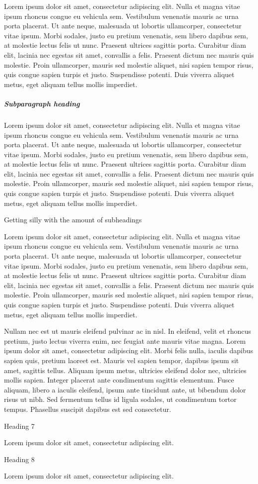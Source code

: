 \documentclass[doc,longtable]{apa6}
\begin{document}
Lorem ipsum dolor sit amet, consectetur adipiscing elit. Nulla et magna
vitae ipsum rhoncus congue eu vehicula sem. Vestibulum venenatis mauris
ac urna porta placerat. Ut ante neque, malesuada ut lobortis
ullamcorper, consectetur vitae ipsum. Morbi sodales, justo eu pretium
venenatis, sem libero dapibus sem, at molestie lectus felis ut nunc.
Praesent ultrices sagittis porta. Curabitur diam elit, lacinia nec
egestas sit amet, convallis a felis. Praesent dictum nec mauris quis
molestie. Proin ullamcorper, mauris sed molestie aliquet, nisi sapien
tempor risus, quis congue sapien turpis et justo. Suspendisse potenti.
Duis viverra aliquet metus, eget aliquam tellus mollis imperdiet.

\hypertarget{subparagraph-heading}{%
\subparagraph{Subparagraph heading}\label{subparagraph-heading}}

Lorem ipsum dolor sit amet, consectetur adipiscing elit. Nulla et magna
vitae ipsum rhoncus congue eu vehicula sem. Vestibulum venenatis mauris
ac urna porta placerat. Ut ante neque, malesuada ut lobortis
ullamcorper, consectetur vitae ipsum. Morbi sodales, justo eu pretium
venenatis, sem libero dapibus sem, at molestie lectus felis ut nunc.
Praesent ultrices sagittis porta. Curabitur diam elit, lacinia nec
egestas sit amet, convallis a felis. Praesent dictum nec mauris quis
molestie. Proin ullamcorper, mauris sed molestie aliquet, nisi sapien
tempor risus, quis congue sapien turpis et justo. Suspendisse potenti.
Duis viverra aliquet metus, eget aliquam tellus mollis imperdiet.

Getting silly with the amount of subheadings

Lorem ipsum dolor sit amet, consectetur adipiscing elit. Nulla et magna
vitae ipsum rhoncus congue eu vehicula sem. Vestibulum venenatis mauris
ac urna porta placerat. Ut ante neque, malesuada ut lobortis
ullamcorper, consectetur vitae ipsum. Morbi sodales, justo eu pretium
venenatis, sem libero dapibus sem, at molestie lectus felis ut nunc.
Praesent ultrices sagittis porta. Curabitur diam elit, lacinia nec
egestas sit amet, convallis a felis. Praesent dictum nec mauris quis
molestie. Proin ullamcorper, mauris sed molestie aliquet, nisi sapien
tempor risus, quis congue sapien turpis et justo. Suspendisse potenti.
Duis viverra aliquet metus, eget aliquam tellus mollis imperdiet.

Nullam nec est ut mauris eleifend pulvinar ac in nisl. In eleifend,
velit et rhoncus pretium, justo lectus viverra enim, nec feugiat ante
mauris vitae magna. Lorem ipsum dolor sit amet, consectetur adipiscing
elit. Morbi felis nulla, iaculis dapibus sapien quis, pretium laoreet
est. Mauris vel sapien tempor, dapibus ipsum sit amet, sagittis tellus.
Aliquam ipsum metus, ultricies eleifend dolor nec, ultricies mollis
sapien. Integer placerat ante condimentum sagittis elementum. Fusce
aliquam, libero a iaculis eleifend, ipsum ante tincidunt ante, ut
bibendum dolor risus ut nibh. Sed fermentum tellus id ligula sodales, ut
condimentum tortor tempus. Phasellus suscipit dapibus est sed
consectetur.

Heading 7

Lorem ipsum dolor sit amet, consectetur adipiscing elit.

Heading 8

Lorem ipsum dolor sit amet, consectetur adipiscing elit.

\newpage

\printbibliography[title=References]
\end{document}
